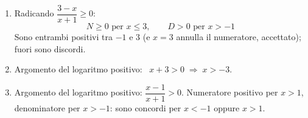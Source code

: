 \begin{question}[ID=1.2, subtitle={Dominio di funzioni razionali e irrazionali}, difficulty=media, tags={funzioni, dominio}]
\begin{explanation}
\begin{enumerate}
    \[ N\geq 0 \text{ per } x\geq 1, \qquad D>0 \text{ per } x>-2 \]
    La frazione è positiva dove $N$ e $D$ hanno lo stesso segno ($x<-2$ oppure $x>1$), nulla in $x=1$; in $x=-2$ non esiste.
    \item Radicando $\dfrac{3-x}{x+1}\geq 0$:
    \[ N\geq 0 \text{ per } x\leq 3, \qquad D>0 \text{ per } x>-1 \]
    Sono entrambi positivi tra $-1$ e $3$ (e $x=3$ annulla il numeratore, accettato); fuori sono discordi.
    \item Argomento del logaritmo positivo: \ $x+3>0 \;\Rightarrow\; x>-3$.
    \item Argomento del logaritmo positivo: $\dfrac{x-1}{x+1}>0$. Numeratore positivo per $x>1$, denominatore per $x>-1$: sono concordi per $x<-1$ oppure $x>1$.
\end{enumerate}
\end{explanation}
\end{question}


